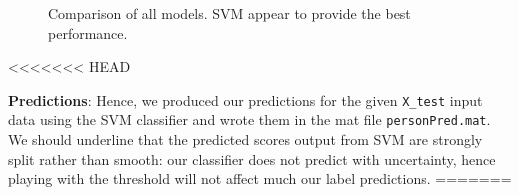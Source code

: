 \documentclass{article}
\begin{document}
   \begin{figure}[ht]
       \center
    	\hfill
	\caption{Comparison of all models. SVM appear to provide the best performance.}
  \end{figure}
<<<<<<< HEAD
  
  \textbf{Predictions}: Hence, we produced our predictions for the given \texttt{X\_test} input data using the SVM classifier and wrote them in the mat file \texttt{personPred.mat}. We should underline that the predicted scores output from SVM are strongly split rather than smooth: our classifier does not predict with uncertainty, hence playing with the threshold will not affect much our label predictions.
=======
\end{document}
